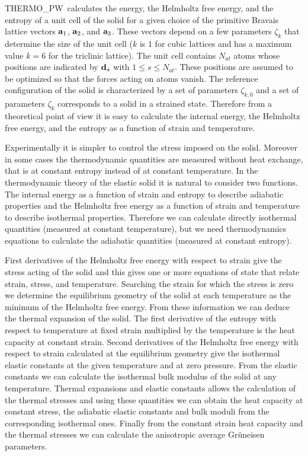 \documentclass[12pt,a4paper]{article}
\def\tpw{{\sc THERMO\_PW}}
\begin{document}
\tpw\ calculates the energy, the Helmholtz free energy, and the
entropy of a unit cell of the solid for a given choice of the primitive 
Bravais lattice vectors ${\bf a}_1$, ${\bf a}_2$, and ${\bf a}_3$. These
vectors depend on a few parameters $\zeta_k$ that determine the size 
of the unit cell ($k$ is $1$ for cubic lattices and has a maximum
value $k=6$ for the triclinic lattice).
The unit cell contains $N_{at}$ atoms
whose positions are indicated by ${\bf d}_s$ with $1\le s\le N_{at}$.
These positions are assumed to be optimized so that the forces acting
on atoms vanish.
The reference configuration of the solid is
characterized by a set of parameters $\zeta_{k,0}$ and a set of parameters 
$\zeta_k$ corresponds to a solid in a strained state.
Therefore from a theoretical point of view it is easy to calculate the 
internal energy, the Helmholtz free energy, and the entropy as a 
function of strain and temperature.

Experimentally it is simpler to control the stress imposed on the solid. 
Moreover in some cases the thermodynamic quantities are measured without 
heat exchange, that is at constant entropy instead of at constant temperature. 
In the thermodynamic theory of the elastic solid it is natural to consider two
functions. The internal energy as a function of strain and entropy  
to describe adiabatic properties and the Helmholtz free energy as a function
of strain and temperature to describe isothermal properties.
Therefore we can calculate directly isothermal quantities (measured at constant
temperature), but we need thermodynamics equations to calculate
the adiabatic quantities (measured at constant entropy).

First derivatives of the Helmholtz free energy with respect to strain
give the stress acting of the solid and this gives one or more equations
of state that relate strain, stress, and temperature. 
Searching the strain for which the stress is zero we determine the 
equilibrium geometry of the solid at each temperature as the minimum of 
the Helmholtz free energy. From these information we can deduce the
thermal expansion of the solid. The first derivative of the entropy 
with respect to temperature at fixed strain multiplied by the temperature
is the heat capacity at constant strain. Second derivatives of the 
Helmholtz free energy with 
respect to strain calculated at the equilibrium geometry give the 
isothermal elastic constants at the given temperature and at zero pressure. 
From the elastic constants we can calculate the isothermal bulk modulus 
of the solid at any temperature. 
Thermal expansions and elastic constants allows the calculation of the thermal
stresses and using these quantities we can obtain the heat capacity at
constant stress, the adiabatic elastic constants and bulk moduli 
from the corresponding isothermal ones. Finally from the constant strain 
heat capacity and the thermal stresses we can calculate the anisotropic 
average Gr\"uneisen parameters.
\end{document}
